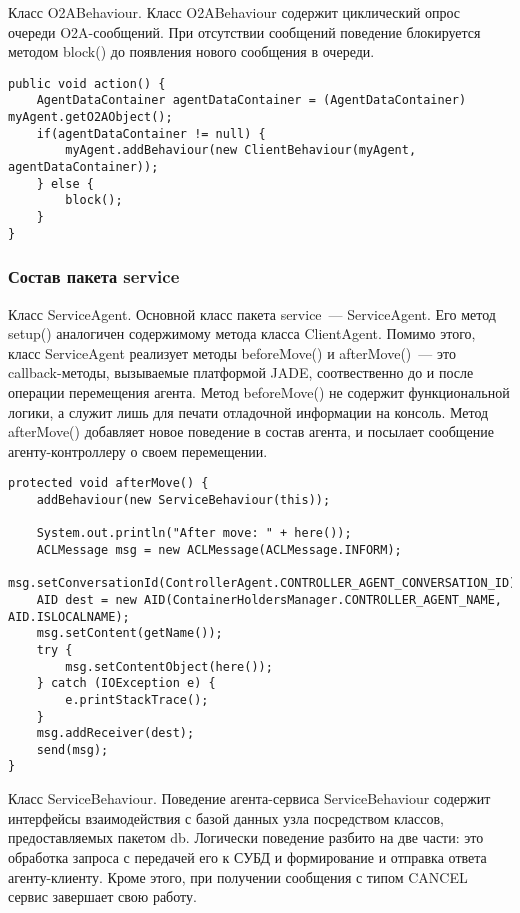 Класс O2ABehaviour. Класс O2ABehaviour содержит циклический опрос очереди O2A-сообщений. При отсутствии сообщений поведение блокируется методом block() до появления нового сообщения в очереди.
\begin{lstlisting}
public void action() {
    AgentDataContainer agentDataContainer = (AgentDataContainer) myAgent.getO2AObject();
    if(agentDataContainer != null) {
        myAgent.addBehaviour(new ClientBehaviour(myAgent, agentDataContainer));
    } else {
        block();
    }
}
\end{lstlisting}

\subsubsection{Состав пакета service}
Класс ServiceAgent. Основной класс пакета service~--- ServiceAgent. Его метод setup() аналогичен содержимому метода класса ClientAgent. Помимо этого, класс ServiceAgent реализует методы beforeMove() и afterMove()~--- это callback-методы, вызываемые платформой JADE, соотвественно до и после операции перемещения агента. Метод beforeMove() не содержит функциональной логики, а служит лишь для печати отладочной информации на консоль. Метод afterMove() добавляет новое поведение в состав агента, и посылает сообщение агенту-контроллеру о своем перемещении.
\begin{lstlisting}
protected void afterMove() {
    addBehaviour(new ServiceBehaviour(this));

    System.out.println("After move: " + here());
    ACLMessage msg = new ACLMessage(ACLMessage.INFORM);
    msg.setConversationId(ControllerAgent.CONTROLLER_AGENT_CONVERSATION_ID);
    AID dest = new AID(ContainerHoldersManager.CONTROLLER_AGENT_NAME, AID.ISLOCALNAME);
    msg.setContent(getName());
    try {
        msg.setContentObject(here());
    } catch (IOException e) {
        e.printStackTrace();
    }
    msg.addReceiver(dest);
    send(msg);
}
\end{lstlisting}

Класс ServiceBehaviour. Поведение агента-сервиса ServiceBehaviour содержит интерфейсы взаимодействия с базой данных узла посредством классов, предоставляемых пакетом db. Логически поведение разбито на две части: это обработка запроса с передачей его к СУБД и формирование и отправка ответа агенту-клиенту. Кроме этого, при получении сообщения с типом CANCEL сервис завершает свою работу.

